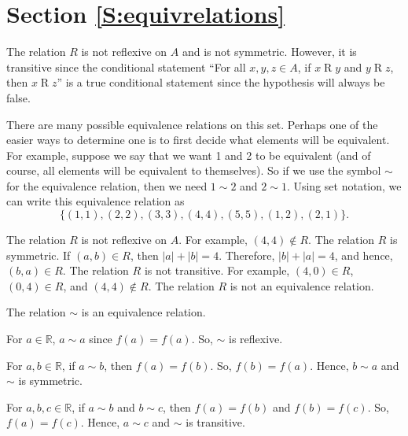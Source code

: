 \section*{Section \ref{S:equivrelations}}

\begin{list}{\bf{\ref{exer:sec72-1}.}}
\item The relation $R$ is not reflexive on $A$ and is not symmetric.  However, it is transitive since the conditional statement ``For all $x, y, z \in A$, if $x \mathrel{R} y$ and $y \mathrel{R} z$, then $x \mathrel{R} z$'' is a true conditional statement since the hypothesis will always be false.
\end{list}


\begin{list}{\bf{\ref{exer71:notidentity}.}}
\item There are many possible equivalence relations on this set.  Perhaps one of the easier ways to determine one is to first decide what elements will be equivalent.  For example, suppose we say that we want 1 and 2 to be equivalent (and of course, all elements will be equivalent to themselves).  So if we use the symbol $\sim$ for the equivalence relation, then we need $1 \sim 2$ and $2 \sim 1$.  Using set notation, we can write this equivalence relation as
\[
\{ (1, 1), (2, 2), (3, 3), (4, 4), (5, 5), (1, 2), (2, 1) \}.
\]
\end{list}



\begin{list}{\bf{\ref{exer:sec72-2}.}}
\item The relation $R$ is not reflexive on $A$.  For example, $\left( 4, 4 \right) \notin R$.
The relation $R$ is symmetric.  If $\left( a, b \right) \in R$, then 
$\left| a \right| + \left| b \right| = 4$.  Therefore, $\left| b \right| + \left| a \right| = 4$, and hence, $\left( b, a \right) \in R$.
The relation $R$ is not transitive.  For example, $\left( 4, 0 \right) \in R$, 
$\left( 0, 4 \right) \in R$, and $\left( 4, 4 \right) \notin R$.
The relation $R$ is not an equivalence relation.
\end{list}


\begin{list}{\bf{\ref{exer:equivrelwithfunction}.}}
\item \begin{list}{\bf{(a)}}
\item The relation $\sim$ is an equivalence relation.  

For $a \in \mathbb{R}$, $a \sim a$ since $f \left( a \right) = f \left( a \right)$.  So, $\sim$ is reflexive.

For $a, b \in \mathbb{R}$, if $a \sim b$, then  $f \left( a \right) = f \left( b \right)$.  So, 
$f \left( b \right) = f \left( a \right)$. Hence, $b \sim a$ and $\sim$ is symmetric.

For $a, b, c  \in \mathbb{R}$, if $a \sim b$ and $b \sim c$, then  
$f \left( a \right) = f \left( b \right)$ and $f \left( b \right) = f \left( c \right)$.  So, 
$f \left( a \right) = f \left( c \right)$. Hence, $a \sim c$ and $\sim$ is transitive.

\end{list}
\end{list}

